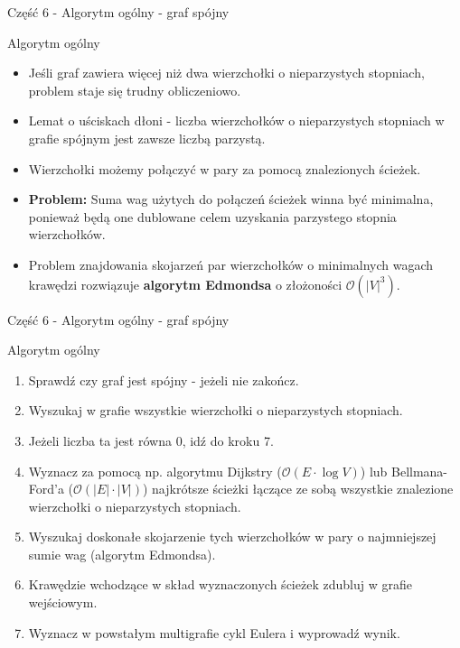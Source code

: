 \documentclass[polish,envcountsect,10pt]{beamer}
\begin{document}
\begin{frame}{Część 6 - Algorytm ogólny - graf spójny}
    \begin{block}{Algorytm ogólny}
        \begin{itemize}
            \item Jeśli graf zawiera więcej niż dwa wierzchołki o nieparzystych stopniach, problem staje się trudny obliczeniowo.
            \item Lemat o uściskach dłoni -  liczba wierzchołków o nieparzystych stopniach w grafie spójnym jest zawsze liczbą parzystą.
            \item Wierzchołki możemy połączyć w pary za pomocą znalezionych ścieżek.
            \item \textbf{Problem:} Suma wag użytych do połączeń ścieżek winna być minimalna, ponieważ będą one dublowane celem uzyskania parzystego stopnia wierzchołków.
            \item Problem znajdowania skojarzeń par wierzchołków o minimalnych wagach krawędzi rozwiązuje \textbf{algorytm Edmondsa} o złożoności $\mathcal{O}(|V|^{3})$.
        \end{itemize}
    \end{block}
\end{frame}

\begin{frame}{Część 6 - Algorytm ogólny - graf spójny}
    \begin{block}{Algorytm ogólny}
        \begin{enumerate}
            \item Sprawdź czy graf jest spójny - jeżeli nie zakończ.
            \item Wyszukaj w grafie wszystkie wierzchołki o nieparzystych stopniach.
            \item Jeżeli liczba ta jest równa 0, idź do kroku 7.
            \item Wyznacz za pomocą np. algorytmu Dijkstry ($\mathcal{O}({E} \cdot {\log V})$) lub Bellmana-Ford'a ($\mathcal{O}(|E| \cdot |V|)$) najkrótsze ścieżki łączące ze sobą wszystkie znalezione wierzchołki o nieparzystych stopniach.
            \item Wyszukaj doskonałe skojarzenie tych wierzchołków w pary o najmniejszej sumie wag (algorytm Edmondsa).
            \item Krawędzie wchodzące w skład wyznaczonych ścieżek zdubluj w grafie wejściowym.
            \item Wyznacz w powstałym multigrafie cykl Eulera i wyprowadź wynik.
        \end{enumerate}
    \end{block}
\end{frame}
\end{document}
